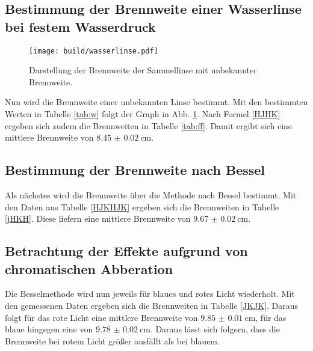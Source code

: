 \subsection{Bestimmung der Brennweite einer Wasserlinse bei festem Wasserdruck}

\begin{figure}
 \centering
 \texttt{[image: build/wasserlinse.pdf]}
 \caption{Darstellung der Brennweite der Sammellinse mit unbekannter Brennweite.}
 \label{fig:water}
\end{figure}

Nun wird die Brennweite einer unbekannten Linse bestimmt. Mit den bestimmten Werten in Tabelle \ref{tab:w} folgt der Graph in Abb. \ref{fig:water}. Nach Formel \eqref{HJHK} ergeben sich zudem die Brennweiten in Tabelle \ref{tab:ff}. Damit ergibt sich eine mittlere Brennweite von $\SI{8.45(2)}{\centi\meter}$.



\subsection{Bestimmung der Brennweite nach Bessel}
 Als nächstes wird die Brennweite über die Methode nach Bessel bestimmt. Mit den Daten aus Tabelle \ref{HJKHJK} ergeben sich die Brennweiten in Tabelle \ref{jHKH}. Diese liefern eine mittlere Brennweite von $\SI{9.67(2)}{\centi\meter}$.

 \subsection{Betrachtung der Effekte aufgrund von chromatischen Abberation}
Die Besselmethode wird nun jeweils für blaues und rotes Licht wiederholt. Mit den gemessenen Daten ergeben sich die Brennweiten in Tabelle \ref{JKJK}. Daraus folgt für das rote Licht eine mittlere Brennweite von $\SI{9.85(1)}{\centi\meter}$, für das blaue hingegen eine von $\SI{9.78(2)}{\centi\meter}$. Daraus lässt sich folgern, dass die Brennweite bei rotem Licht größer ausfällt als bei blauem.
